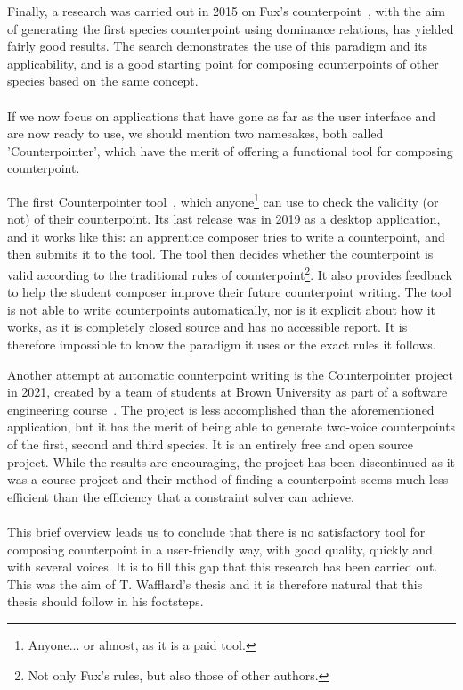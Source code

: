 Finally, a research was carried out in 2015 on Fux's counterpoint~\cite{komosinski2015automatic}, with the aim of generating the first species counterpoint using dominance relations, has yielded fairly good results. The search demonstrates the use of this paradigm and its applicability, and is a good starting point for composing counterpoints of other species based on the same concept.

\paragraph{}
If we now focus on applications that have gone as far as the user interface and are now ready to use, we should mention two namesakes, both called 'Counterpointer', which have the merit of offering a functional tool for composing counterpoint.

The first Counterpointer tool~\cite{counterpointer_ms}, which anyone\footnote{Anyone... or almost, as it is a paid tool.} can use to check the validity (or not) of their counterpoint. Its last release was in 2019 as a desktop application, and it works like this: an apprentice composer tries to write a counterpoint, and then submits it to the tool. The tool then decides whether the counterpoint is valid according to the traditional rules of counterpoint\footnote{Not only Fux's rules, but also those of other authors.}. It also provides feedback to help the student composer improve their future counterpoint writing. The tool is not able to write counterpoints automatically, nor is it explicit about how it works, as it is completely closed source and has no accessible report. It is therefore impossible to know the paradigm it uses or the exact rules it follows.

Another attempt at automatic counterpoint writing is the Counterpointer project in 2021, created by a team of students at Brown University as part of a software engineering course~\cite{counterpointer_project}. The project is less accomplished than the aforementioned application, but it has the merit of being able to generate two-voice counterpoints of the first, second and third species. It is an entirely free and open source project. While the results are encouraging, the project has been discontinued as it was a course project and their method of finding a counterpoint seems much less efficient than the efficiency that a constraint solver can achieve. 


\paragraph{}
This brief overview leads us to conclude that there is no satisfactory tool for composing counterpoint in a user-friendly way, with good quality, quickly and with several voices. It is to fill this gap that this research has been carried out. This was the aim of T. Wafflard's thesis and it is therefore natural that this thesis should follow in his footsteps.



